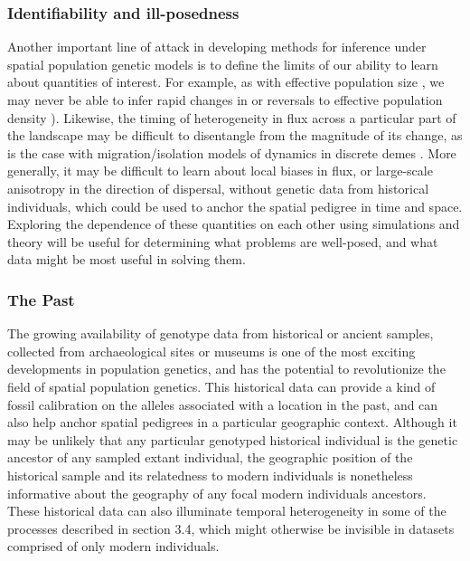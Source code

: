 \documentclass{ar-1col}
\begin{document}
\subsubsection{Identifiability and ill-posedness}

Another important line of attack in developing methods for inference 
under spatial population genetic models 
is to define the limits of our ability to learn about 
quantities of interest.
For example, 
as with effective population size \citep{Myers2008},
we may never be able to infer rapid changes in 
or reversals to effective population density
\citep[although see also][]{BhaskarSong2014descartes}).
Likewise, 
the timing of heterogeneity in flux across a particular part of the landscape 
may be difficult to disentangle from the magnitude of its change, 
as is the case with migration/isolation models 
of dynamics in discrete demes \citep{sousa2011nonidentifiability}.
More generally,
it may be difficult to learn about local biases in flux, 
or large-scale anisotropy in the direction of dispersal,
without genetic data from historical individuals, 
which could be used to anchor the spatial pedigree 
in time and space.
Exploring the dependence of these quantities on each other 
using simulations and theory 
will be useful for determining what problems are well-posed, 
and what data might be most useful in solving them.


\subsubsection{The Past} 
The growing availability of genotype data from historical or ancient samples, 
collected from archaeological sites or museums 
is one of the most exciting developments in population genetics, 
and has the potential to revolutionize the field of spatial population genetics.
This historical data can provide a kind of fossil calibration on 
the alleles associated with a location in the past, 
and can also help anchor spatial pedigrees in a particular geographic context.
Although it may be unlikely that any particular genotyped historical individual 
is the genetic ancestor of any sampled extant individual, 
the geographic position of the historical sample and its 
relatedness to modern individuals is nonetheless informative 
about the geography of any focal modern individuals ancestors.
These historical data can also illuminate temporal heterogeneity 
in some of the processes described in section 3.4, 
which might otherwise be invisible in datasets comprised of only modern individuals.
\end{document}
